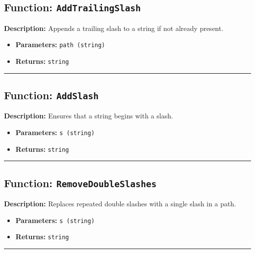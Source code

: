 \documentclass[12pt,a4paper]{article}
\begin{document}
\subsection*{Function: \texttt{AddTrailingSlash}}
\textbf{Description:} Appends a trailing slash to a string if not already present.
\begin{itemize}[leftmargin=2cm,label={--}]
  \item \textbf{Parameters:} \texttt{path (string)}
  \item \textbf{Returns:} \texttt{string}
\end{itemize}
\hrule\vspace{1em}

\subsection*{Function: \texttt{AddSlash}}
\textbf{Description:} Ensures that a string begins with a slash.
\begin{itemize}[leftmargin=2cm,label={--}]
  \item \textbf{Parameters:} \texttt{s (string)}
  \item \textbf{Returns:} \texttt{string}
\end{itemize}
\hrule\vspace{1em}

\subsection*{Function: \texttt{RemoveDoubleSlashes}}
\textbf{Description:} Replaces repeated double slashes with a single slash in a path.
\begin{itemize}[leftmargin=2cm,label={--}]
  \item \textbf{Parameters:} \texttt{s (string)}
  \item \textbf{Returns:} \texttt{string}
\end{itemize}
\hrule\vspace{1em}
\end{document}

